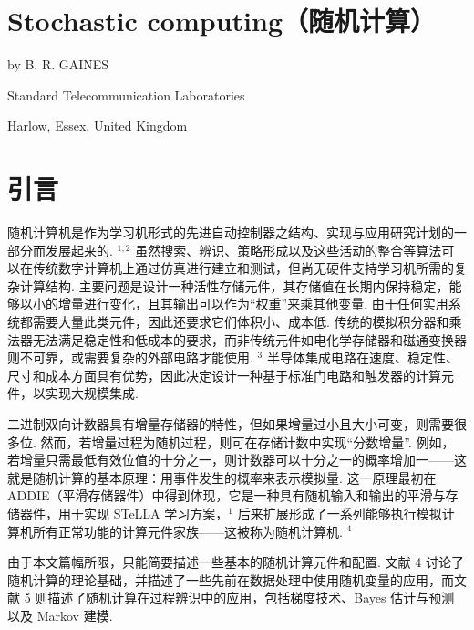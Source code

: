 \section{Stochastic computing（随机计算）}

by B. R. GAINES

Standard Telecommunication Laboratories

Harlow, Essex, United Kingdom

\section{引言}

随机计算机是作为学习机形式的先进自动控制器之结构、实现与应用研究计划的一部分而发展起来的. \(^{1,2}\) 虽然搜索、辨识、策略形成以及这些活动的整合等算法可以在传统数字计算机上通过仿真进行建立和测试，但尚无硬件支持学习机所需的复杂计算结构. 主要问题是设计一种活性存储元件，其存储值在长期内保持稳定，能够以小的增量进行变化，且其输出可以作为``权重''来乘其他变量. 由于任何实用系统都需要大量此类元件，因此还要求它们体积小、成本低. 传统的模拟积分器和乘法器无法满足稳定性和低成本的要求，而非传统元件如电化学存储器和磁通变换器则不可靠，或需要复杂的外部电路才能使用. \(^{3}\) 半导体集成电路在速度、稳定性、尺寸和成本方面具有优势，因此决定设计一种基于标准门电路和触发器的计算元件，以实现大规模集成.

二进制双向计数器具有增量存储器的特性，但如果增量过小且大小可变，则需要很多位. 然而，若增量过程为随机过程，则可在存储计数中实现``分数增量''. 例如，若增量只需最低有效位值的十分之一，则计数器可以十分之一的概率增加一——这就是随机计算的基本原理：用事件发生的概率来表示模拟量. 这一原理最初在 ADDIE（平滑存储器件）中得到体现，它是一种具有随机输入和输出的平滑与存储器件，用于实现 STeLLA 学习方案，\(^{1}\) 后来扩展形成了一系列能够执行模拟计算机所有正常功能的计算元件家族——这被称为随机计算机. \(^{4}\)

由于本文篇幅所限，只能简要描述一些基本的随机计算元件和配置. 文献 4 讨论了随机计算的理论基础，并描述了一些先前在数据处理中使用随机变量的应用，而文献 5 则描述了随机计算在过程辨识中的应用，包括梯度技术、Bayes 估计与预测以及 Markov 建模.
